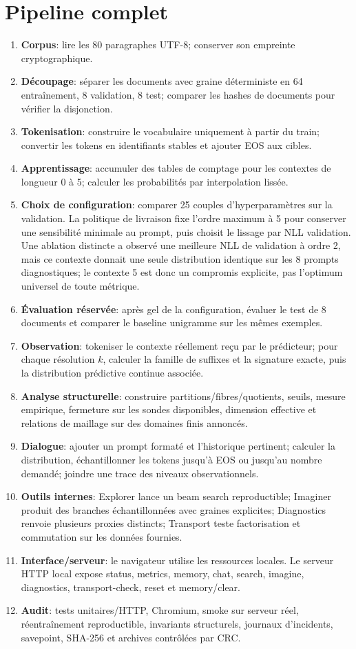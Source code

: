 \documentclass[11pt,a4paper]{article}
\begin{document}
\section{Pipeline complet}
\begin{enumerate}[leftmargin=*,itemsep=2pt]
\item \textbf{Corpus}: lire les 80 paragraphes UTF-8; conserver son empreinte cryptographique.
\item \textbf{Découpage}: séparer les documents avec graine déterministe en 64 entraînement, 8 validation, 8 test; comparer les hashes de documents pour vérifier la disjonction.
\item \textbf{Tokenisation}: construire le vocabulaire uniquement à partir du train; convertir les tokens en identifiants stables et ajouter EOS aux cibles.
\item \textbf{Apprentissage}: accumuler des tables de comptage pour les contextes de longueur 0 à 5; calculer les probabilités par interpolation lissée.
\item \textbf{Choix de configuration}: comparer 25 couples d'hyperparamètres sur la validation. La politique de livraison fixe l'ordre maximum à 5 pour conserver une sensibilité minimale au prompt, puis choisit le lissage par NLL validation. Une ablation distincte a observé une meilleure NLL de validation à ordre 2, mais ce contexte donnait une seule distribution identique sur les 8 prompts diagnostiques; le contexte 5 est donc un compromis explicite, pas l'optimum universel de toute métrique.
\item \textbf{Évaluation réservée}: après gel de la configuration, évaluer le test de 8 documents et comparer le baseline unigramme sur les mêmes exemples.
\item \textbf{Observation}: tokeniser le contexte réellement reçu par le prédicteur; pour chaque résolution $k$, calculer la famille de suffixes et la signature exacte, puis la distribution prédictive continue associée.
\item \textbf{Analyse structurelle}: construire partitions/fibres/quotients, seuils, mesure empirique, fermeture sur les sondes disponibles, dimension effective et relations de maillage sur des domaines finis annoncés.
\item \textbf{Dialogue}: ajouter un prompt formaté et l'historique pertinent; calculer la distribution, échantillonner les tokens jusqu'à EOS ou jusqu'au nombre demandé; joindre une trace des niveaux observationnels.
\item \textbf{Outils internes}: Explorer lance un beam search reproductible; Imaginer produit des branches échantillonnées avec graines explicites; Diagnostics renvoie plusieurs proxies distincts; Transport teste factorisation et commutation sur les données fournies.
\item \textbf{Interface/serveur}: le navigateur utilise les ressources locales. Le serveur HTTP local expose status, metrics, memory, chat, search, imagine, diagnostics, transport-check, reset et memory/clear.
\item \textbf{Audit}: tests unitaires/HTTP, Chromium, smoke sur serveur réel, réentraînement reproductible, invariants structurels, journaux d'incidents, savepoint, SHA-256 et archives contrôlées par CRC.
\end{enumerate}
\end{document}
